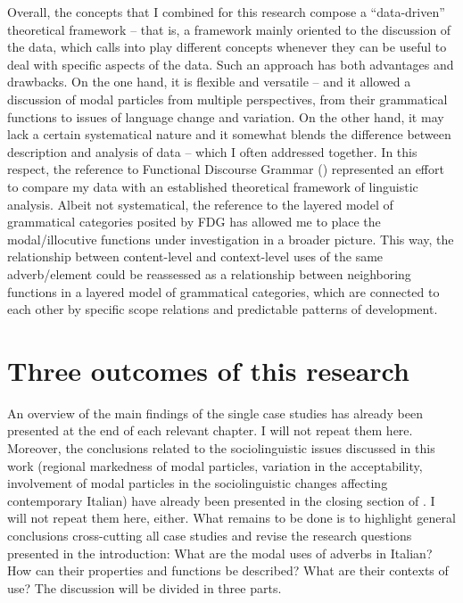 Overall, the concepts that I combined for this research compose a “data-driven” theoretical framework – that is, a framework mainly oriented to the discussion of the data, which calls into play different concepts whenever they can be useful to deal with specific aspects of the data. Such an approach has both advantages and drawbacks. On the one hand, it is flexible and versatile – and it allowed a discussion of modal particles from multiple perspectives, from their grammatical functions to issues of language change and variation. On the other hand, it may lack a certain systematical nature and it somewhat blends the difference between description and analysis of data – which I often addressed together. In this respect, the reference to Functional Discourse Grammar (\citealt{HengeveldMackenzie2008}) represented an effort to compare my data with an established theoretical framework of linguistic analysis. Albeit not systematical, the reference to the layered model of grammatical categories posited by FDG has allowed me to place the modal/illocutive functions under investigation in a broader picture. This way, the relationship between content-level and context-level uses of the same adverb/element could be reassessed as a relationship between neighboring functions in a layered model of grammatical categories, which are connected to each other by specific scope relations and predictable patterns of development.

\section{Three outcomes of this research}
\hypertarget{Toc124860695}{}
An overview of the main findings of the single case studies has already been presented at the end of each relevant chapter. I will not repeat them here. Moreover, the conclusions related to the sociolinguistic issues discussed in this work (regional markedness of modal particles, variation in the acceptability, involvement of modal particles in the sociolinguistic changes affecting contemporary Italian) have already been presented in the closing section of . I will not repeat them here, either. What remains to be done is to highlight general conclusions cross-cutting all case studies and revise the research questions presented in the introduction: What are the modal uses of adverbs in Italian? How can their properties and functions be described? What are their contexts of use? The discussion will be divided in three parts.

